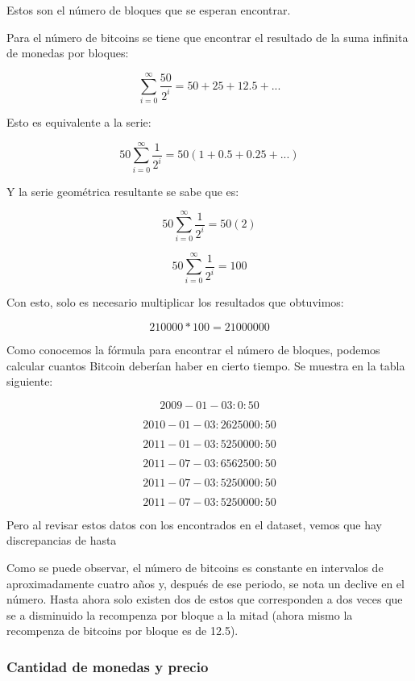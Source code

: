 \documentclass[12pt,letterpaper]{article}
\begin{document}
    Estos son el n\'umero de bloques que se esperan encontrar.

    Para el n\'umero de bitcoins se tiene que encontrar el resultado de la suma infinita de monedas por bloques:
    
    $$ \sum_{i = 0}^{\infty} \frac{50}{2^{i}} = 50 + 25 + 12.5 + ...$$

    Esto es equivalente a la serie:

    $$ 50 \sum_{i = 0}^{\infty} \frac{1}{2^{i}} = 50 (1 + 0.5 + 0.25 + ...) $$

    Y la serie geom\'etrica resultante se sabe que es:

    $$ 50 \sum_{i = 0}^{\infty} \frac{1}{2^{i}} = 50 (2) $$

    $$ 50 \sum_{i = 0}^{\infty} \frac{1}{2^{i}} = 100 $$

    Con esto, solo es necesario multiplicar los resultados que obtuvimos:

    $$ 210000 * 100 = 21000000 $$

    Como conocemos la f\'ormula para encontrar el n\'umero de bloques, podemos calcular cuantos Bitcoin deber\'ian haber en cierto tiempo. Se muestra en la tabla siguiente:

    $$ 2009-01-03 : 0  : 50$$
        
    $$ 2010-01-03 : 2625000 : 50  $$

    $$ 2011-01-03 : 5250000 : 50  $$

    $$ 2011-07-03 : 6562500 : 50  $$

    $$ 2011-07-03 : 5250000 : 50  $$

    $$ 2011-07-03 : 5250000 : 50  $$

    Pero al revisar estos datos con los encontrados en el dataset, vemos que hay discrepancias de hasta %



    Como se puede observar, el n\'umero de bitcoins es constante en intervalos de aproximadamente cuatro a\~nos y, despu\'es de ese periodo, se nota un declive en el n\'umero. Hasta ahora solo existen dos de estos que corresponden a dos veces que se a disminuido la recompenza por bloque a la mitad (ahora mismo la recompenza de bitcoins por bloque es de 12.5).


    \subsubsection*{Cantidad de monedas y precio}
\end{document}
